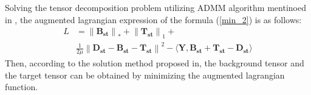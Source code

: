 \documentclass[journal]{IEEEtran}
\begin{document}
Solving the tensor decomposition problem utilizing ADMM algorithm mentinoed in \cite{dai2017reweighted}, the augmented lagrangian expression of the formula (\ref{min_2}) is as follows:
\begin{equation}
  \begin{split}
    L & = \left \|\bm{B_{st}} \right \| _* +\left \|\bm{T_{st}} \right \| _1 + \\
    & \frac{1}{2\mu} \left \|\bm{D_{st}}-\bm{B_{st}}-\bm{T_{st}} \right \| ^2 - \langle\bm{Y},\bm{B_{st}}+\bm{T_{st}}-\bm{D_{st}}\rangle
  \end{split}
\end{equation}
Then, according to the solution method proposed in\cite{dai2017reweighted}, the background tensor and the target tensor can be obtained by minimizing the augmented lagrangian function.
\end{document}
